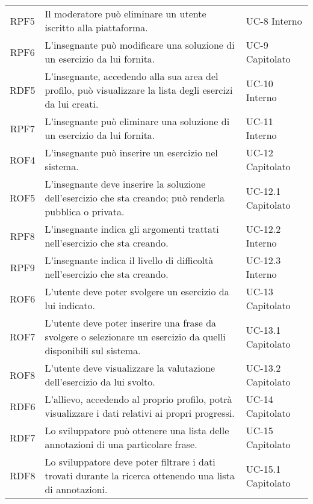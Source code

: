 \begin{tabularx}{\textwidth}{| c | p{10cm} | X |}
		RPF5 & Il moderatore può eliminare un utente iscritto alla piattaforma. & UC-8 \newline Interno\\
		RPF6 & L'insegnante può modificare una soluzione di un esercizio da lui fornita. & UC-9 \newline Capitolato\\
		RDF5 & L'insegnante, accedendo alla sua area del profilo, può visualizzare la lista degli esercizi da lui creati. & UC-10 \newline Interno\\
		RPF7 & L'insegnante può eliminare una soluzione di un esercizio da lui fornita. & UC-11 \newline Interno\\
		ROF4 & L'insegnante può inserire un esercizio nel sistema. & UC-12 \newline Capitolato\\
		ROF5 & L'insegnante deve inserire la soluzione dell'esercizio che sta creando; può renderla pubblica o privata. & UC-12.1 \newline Capitolato\\
		RPF8 & L'insegnante indica gli argomenti trattati nell'esercizio che sta creando. & UC-12.2 \newline Interno\\
		RPF9 & L'insegnante indica il livello di difficoltà nell'esercizio che sta creando. & UC-12.3 \newline Interno\\
		ROF6 & L'utente deve poter svolgere un esercizio da lui indicato. & UC-13 \newline Capitolato\\
		ROF7 & L'utente deve poter inserire una frase da svolgere o selezionare un esercizio da quelli disponibili sul sistema. & UC-13.1 \newline Capitolato\\
		ROF8 & L'utente deve visualizzare la valutazione dell'esercizio da lui svolto. & UC-13.2 \newline Capitolato\\
		RDF6 & L'allievo, accedendo al proprio profilo, potrà visualizzare i dati relativi ai propri progressi. & UC-14 \newline Capitolato\\
		RDF7 & Lo sviluppatore può ottenere una lista delle annotazioni di una particolare frase. & UC-15 \newline Capitolato\\
		RDF8 & Lo sviluppatore deve poter filtrare i dati trovati durante la ricerca ottenendo una lista di annotazioni. & UC-15.1 \newline Capitolato\\

\end{tabularx}
